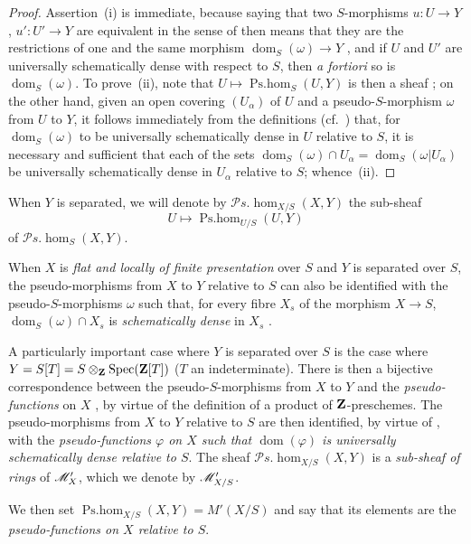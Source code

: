 \begin{proof}
Assertion~(i) is immediate, because saying that two $S$-morphisms $u:U\to Y$, $u':U'\to Y$ are equivalent in the sense of  then means that they are the restrictions of one and the same morphism $\operatorname{dom}_S(\omega)\to Y$ , and if $U$ and $U'$ are universally schematically dense with respect to $S$, then \emph{a fortiori} so is $\operatorname{dom}_S(\omega)$.
To prove~(ii), note that $U\mapsto\operatorname{Ps.hom}_S(U,Y)$ is then a sheaf ; on the other hand, given an open covering $(U_\alpha)$ of $U$ and a pseudo-$S$-morphism $\omega$ from $U$ to $Y$, it follows immediately from the definitions (cf.\ ) that, for $\operatorname{dom}_S(\omega)$ to be universally schematically dense in $U$ relative to $S$, it is necessary and sufficient that each of the sets $\operatorname{dom}_S(\omega)\cap U_\alpha=\operatorname{dom}_S(\omega|U_\alpha)$ be universally schematically dense in $U_\alpha$ relative to $S$; whence~(ii).
\end{proof}

When $Y$ is separated, we will denote by $\mathscr{P}\!s.\!\operatorname{hom}_{X/S}(X,Y)$ the sub-sheaf
\[
  U\mapsto\operatorname{Ps.hom}_{U/S}(U,Y)
\]
of $\mathscr{P}\!s.\!\operatorname{hom}_S(X,Y)$.

When $X$ is \emph{flat and locally of finite presentation} over $S$ and $Y$ is separated over $S$, the pseudo-morphisms from $X$ to $Y$ relative to $S$ can also be identified with the pseudo-$S$-morphisms $\omega$ such that, for every fibre $X_s$ of the morphism $X\to S$, $\operatorname{dom}_S(\omega)\cap X_s$ is \emph{schematically dense} in $X_s$ .

\begin{env}[20.5.4]\label{IV.20.5.4}
A particularly important case where $Y$ is separated over $S$ is the case where $Y=S[T]=S\otimes_{\mathbf{Z}}\operatorname{Spec}(\mathbf{Z}[T])$ ($T$ an indeterminate).
There is then a bijective correspondence between the pseudo-$S$-morphisms from $X$ to $Y$ and the \emph{pseudo-functions} on $X$ , by virtue of the definition of a product of $\mathbf{Z}$-preschemes.
The pseudo-morphisms from $X$ to $Y$ relative to $S$ are then identified, by virtue of , with the \emph{pseudo-functions $\varphi$ on $X$ such that $\operatorname{dom}(\varphi)$ is universally schematically dense relative to $S$}.
The sheaf $\mathscr{P}\!s.\!\operatorname{hom}_{X/S}(X,Y)$ is a \emph{sub-sheaf of rings} of $\mathscr{M}'_X$, which we denote by $\mathscr{M}'_{X/S}$.

We then set $\operatorname{Ps.hom}_{X/S}(X,Y)=M'(X/S)$ and say that its elements are the \emph{pseudo-functions on $X$ relative to $S$}.
\end{env}

